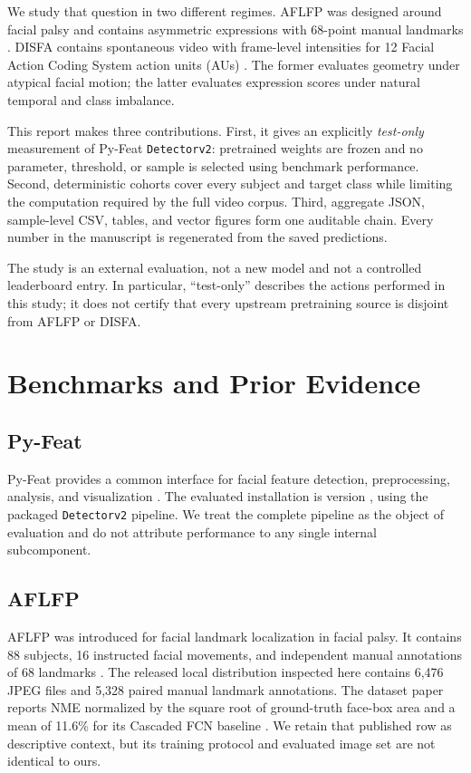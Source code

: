 \documentclass[10pt,journal]{IEEEtran}
\newcommand{\code}[1]{\texttt{#1}}
\begin{document}
We study that question in two different regimes. AFLFP was designed around
facial palsy and contains asymmetric expressions with 68-point manual
landmarks \cite{xia2023aflfp}. DISFA contains spontaneous video with
frame-level intensities for 12 Facial Action Coding System action units (AUs)
\cite{mavadati2013disfa}. The former evaluates geometry under atypical facial
motion; the latter evaluates expression scores under natural temporal and
class imbalance.

This report makes three contributions. First, it gives an explicitly
\emph{test-only} measurement of Py-Feat \code{Detectorv2}: pretrained weights
are frozen and no parameter, threshold, or sample is selected using benchmark
performance. Second, deterministic cohorts cover every subject and target
class while limiting the computation required by the full video corpus.
Third, aggregate JSON, sample-level CSV, tables, and vector figures form one
auditable chain. Every number in the manuscript is regenerated from the saved
predictions.

The study is an external evaluation, not a new model and not a controlled
leaderboard entry. In particular, ``test-only'' describes the actions
performed in this study; it does not certify that every upstream pretraining
source is disjoint from AFLFP or DISFA.

\section{Benchmarks and Prior Evidence}

\subsection{Py-Feat}

Py-Feat provides a common interface for facial feature detection,
preprocessing, analysis, and visualization \cite{cheong2023pyfeat}. The
evaluated installation is version \PyFeatVersion{}, using the packaged
\code{Detectorv2} pipeline. We treat the complete pipeline as the object of
evaluation and do not attribute performance to any single internal
subcomponent.

\subsection{AFLFP}

AFLFP was introduced for facial landmark localization in facial palsy. It
contains 88 subjects, 16 instructed facial movements, and independent manual
annotations of 68 landmarks \cite{xia2023aflfp}. The released local
distribution inspected here contains 6,476 JPEG files and 5,328 paired manual
landmark annotations. The dataset paper reports NME normalized by the square
root of ground-truth face-box area and a mean of 11.6\% for its Cascaded FCN
baseline \cite{xia2023aflfp}. We retain that published row as descriptive
context, but its training protocol and evaluated image set are not identical
to ours.
\end{document}
